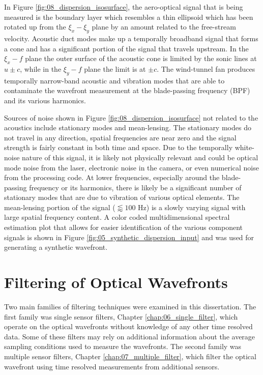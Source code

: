 In Figure \ref{fig:08_dispersion_isosurface}, the aero-optical signal that is being measured is the boundary layer which resembles a thin ellipsoid which has been rotated up from the $\xi_x-\xi_y$ plane by an amount related to the free-stream velocity.
Acoustic duct modes make up a temporally broadband signal that forms a cone and has a significant portion of the signal that travels upstream.
In the $\xi_x-f$ plane the outer surface of the acoustic cone is limited by the sonic lines at $u\pm c$, while in the $\xi_y-f$ plane the limit is at $\pm c$.
The wind-tunnel fan produces temporally narrow-band acoustic and vibration modes that are able to contaminate the wavefront measurement at the blade-passing frequency (BPF) and its various harmonics.

Sources of noise shown in Figure \ref{fig:08_dispersion_isosurface} not related to the acoustics include stationary modes and mean-lensing.
The stationary modes do not travel in any direction, spatial frequencies are near zero and the signal strength is fairly constant in both time and space.
Due to the temporally white-noise nature of this signal, it is likely not physically relevant and could be optical mode noise from the laser, electronic noise in the camera, or even numerical noise from the processing code.
At lower frequencies, especially around the blade-passing frequency or its harmonics, there is likely be a significant number of stationary modes that are due to vibration of various optical elements.
The mean-lensing portion of the signal ($\lessapprox 100$ Hz) is a slowly varying signal with large spatial frequency content.
A color coded multidimensional spectral estimation plot that allows for easier identification of the various component signals is shown in Figure \ref{fig:05_synthetic_dispersion_input} and was used for generating a synthetic wavefront.

\section{Filtering of Optical Wavefronts}
Two main families of filtering techniques were examined in this dissertation.
The first family was single sensor filters, Chapter \ref{chap:06_single_filter}, which operate on the optical wavefronts without knowledge of any other time resolved data.
Some of these filters may rely on additional information about the average sampling conditions used to measure the wavefronts.
The second family was multiple sensor filters, Chapter \ref{chap:07_multiple_filter}, which filter the optical wavefront using time resolved measurements from additional sensors.

